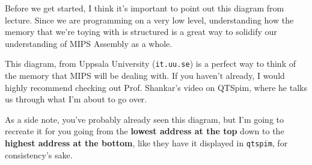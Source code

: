 \documentclass[english, 10pt]{article}
\begin{document}
Before we get started, I think it's important to point out this diagram from lecture. Since we are programming on a very low level, understanding how the memory that we're toying with is structured is a great way to solidify our understanding of MIPS Assembly as a whole.\newline

This diagram, from Uppsala University (\texttt{it.uu.se}) is a perfect way to think of the memory that MIPS will be dealing with. If you haven't already, I would highly recommend checking out Prof. Shankar's video on QTSpim, where he talks us through what I'm about to go over.\newline

As a side note, you've probably already seen this diagram, but I'm going to recreate it for you going from the \textbf{lowest address at the top} down to the \textbf{highest address at the bottom}, like they have it displayed in \texttt{qtspim}, for consistency's sake.\newline
\end{document}
